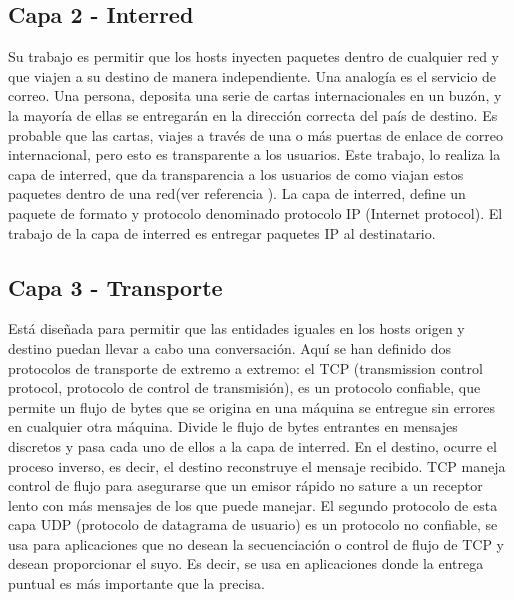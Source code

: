 \subsection{Capa 2 - Interred}
Su trabajo es permitir que los hosts inyecten paquetes dentro de cualquier red y que viajen a su destino de manera independiente. Una analogía es el servicio de correo. Una persona, deposita una serie de cartas internacionales en un buzón, y la mayoría de ellas se entregarán en la dirección correcta del país de destino. Es probable que las cartas, viajes a través de una o más puertas de enlace de correo internacional, pero esto es transparente a los usuarios. Este trabajo, lo realiza la capa de interred, que da transparencia a los usuarios de como viajan estos paquetes dentro de una red(ver referencia \cite{Stallings2004}). 
La capa de interred, define un paquete de formato y protocolo denominado protocolo IP (Internet protocol). El trabajo de la capa de interred es entregar paquetes IP al destinatario. 

\subsection{Capa 3 - Transporte}
Está diseñada para permitir que las entidades iguales en los hosts origen y destino puedan llevar a cabo una conversación. Aquí se han definido dos protocolos de transporte de extremo a extremo: el TCP (transmission control protocol, protocolo de control de transmisión), es un protocolo confiable, que permite un flujo de bytes que se origina en una máquina se entregue sin errores en cualquier otra máquina. Divide le flujo de bytes entrantes en mensajes discretos y pasa cada uno de ellos a la capa de interred. En el destino, ocurre el proceso inverso, es decir, el destino reconstruye el mensaje recibido. TCP maneja control de flujo para asegurarse que un emisor rápido no sature a un receptor lento con más mensajes de los que puede manejar. 
El segundo protocolo de esta capa UDP (protocolo de datagrama de usuario) es un protocolo no confiable, se usa para aplicaciones que no desean la secuenciación o control de flujo de TCP y desean proporcionar el suyo. Es decir, se usa en aplicaciones donde la entrega puntual es más importante que la precisa. 




